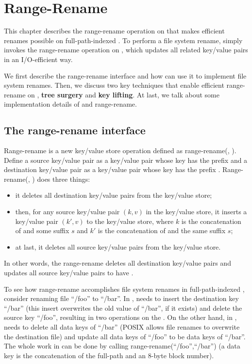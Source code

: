 \chapter{Range-Rename}
\label{chap:rename}

This chapter describes the range-rename operation on \bets that makes
efficient renames possible on full-path-indexed \betrfs.
To perform a file system rename, \betrfs simply invokes the range-rename
operation on \bets,
which updates all related key/value pairs in an I/O-efficient way.

We first describe the range-rename interface and how \betrfs can use it to
implement file system renames.
Then, we discuss two key techniques that enable efficient range-rename
on \bets, \textbf{tree surgery} and \textbf{key lifting}.
At last, we talk about some implementation details of \betrfs and range-rename.

\section{The range-rename interface}

Range-rename is a new key/value store operation defined as
range-rename(\spre, \dpre).
Define a source key/value pair as a key/value pair whose key has the prefix \spre
and a destination key/value pair as a key/value pair whose key has the prefix \dpre.
Range-rename(\spre, \dpre) does three things:
\begin{itemize}
\item it deletes all destination key/value pairs from the key/value store;
\item then, for any source key/value pair $(k,v)$ in the key/value store,
it inserts a key/value pair $(k',v)$ to the key/value store,
where $k$ is the concatenation of \spre and some suffix $s$ and $k'$ is the
concatenation of \dpre and the same suffix $s$;
\item at last, it deletes all source key/value pairs from the key/value store.
\end{itemize}
In other words, the range-rename deletes all destination key/value pairs and
updates all source key/value pairs to have \dpre.

To see how range-rename accomplishes file system renames in full-path-indexed
\betrfs, consider renaming file ``/foo'' to ``/bar''.
In \mdb, \betrfs needs to insert the destination key ``/bar''
(this insert overwrites the old value of ``/bar'', if it exists)
and delete the source key ``/foo'', resulting in two operations on the \bet.
On the other hand, in \ddb, \betrfs needs to delete all data keys of ``/bar''
(POSIX allows file renames to overwrite the destination file) and update all
data keys of ``/foo'' to be data keys of ``/bar''.
The whole work in \ddb can be done by calling range-rename(``/foo'',``/bar'')
(a data key is the concatenation of the full-path and an 8-byte block number).

